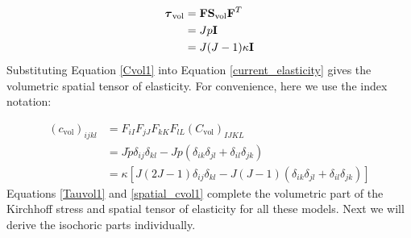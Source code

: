 \begin{appendices}
\begin{subequations}
\label{Tauvol1}
\begin{align}
\boldsymbol{\tau}_\mathrm{vol} &= \bold{F}\bold{S}_\mathrm{vol}{\bold{F}}^T \\
				    &= Jp\bold{I} \label{Tauvol11}\\
		      		    &= J(J-1)\kappa \bold{I} \label{Tauvol12}
\end{align}
\end{subequations}
Substituting Equation \ref{Cvol1} into Equation \ref{current_elasticity} gives the volumetric spatial tensor of elasticity. For convenience, here we use the index notation:

\begin{subequations} \label{spatial_cvol1}
\begin{align}
(c_\mathrm{vol})_{ijkl} &= F_{iI}F_{jJ}F_{kK}F_{lL}(C_\mathrm{vol})_{IJKL} \\
&= J\tilde{p}\delta_{ij}\delta_{kl} - Jp(\delta_{ik}\delta_{jl} + \delta_{il}\delta_{jk}) \label{spatial_cvol11} \\
&= \kappa[J(2J-1)\delta_{ij}\delta_{kl} - J(J-1)(\delta_{ik}\delta_{jl} + \delta_{il}\delta_{jk})] \label{spatial_cvol12}
\end{align}
\end{subequations} 
Equations \ref{Tauvol1} and \ref{spatial_cvol1} complete the volumetric part of the Kirchhoff stress and spatial tensor of elasticity for all these models. Next we will derive the isochoric parts individually.


\end{appendices}
